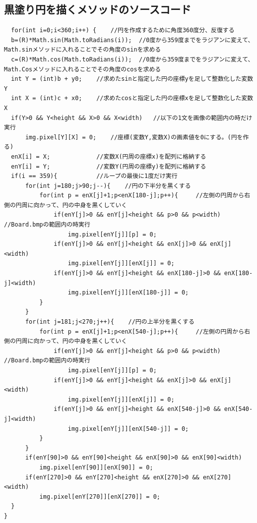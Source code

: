 \documentclass{jsarticle}
\begin{document}
\subsection{黒塗り円を描くメソッドのソースコード}
\begin{verbatim}
  for(int i=0;i<360;i++) {    //円を作成するために角度360度分、反復する
  b=(R)*Math.sin(Math.toRadians(i));  //0度から359度までをラジアンに変えて、Math.sinメソッドに入れることでその角度のsinを求める
  c=(R)*Math.cos(Math.toRadians(i));  //0度から359度までをラジアンに変えて、Math.Cosメソッドに入れることでその角度のcosを求める
  int Y = (int)b + y0;    //求めたsinと指定した円の座標yを足して整数化した変数Y
  int X = (int)c + x0;    //求めたcosと指定した円の座標xを足して整数化した変数X
  if(Y>0 && Y<height && X>0 && X<width)   //以下の1文を画像の範囲内の時だけ実行
      img.pixel[Y][X] = 0;    //座標(変数Y,変数X)の画素値を0にする。(円を作る)
  enX[i] = X;             //変数X(円周の座標x)を配列に格納する
  enY[i] = Y;             //変数Y(円周の座標y)を配列に格納する
  if(i == 359){           //ループの最後に1度だけ実行
      for(int j=180;j>90;j--){    //円の下半分を黒くする
          for(int p = enX[j]+1;p<enX[180-j];p++){     //左側の円周から右側の円周に向かって、円の中身を黒くしていく
              if(enY[j]>0 && enY[j]<height && p>0 && p<width) //Board.bmpの範囲内の時実行
                  img.pixel[enY[j]][p] = 0;
              if(enY[j]>0 && enY[j]<height && enX[j]>0 && enX[j]<width)
                  img.pixel[enY[j]][enX[j]] = 0;
              if(enY[j]>0 && enY[j]<height && enX[180-j]>0 && enX[180-j]<width)
                  img.pixel[enY[j]][enX[180-j]] = 0;
          }
      }
      for(int j=181;j<270;j++){    //円の上半分を黒くする
          for(int p = enX[j]+1;p<enX[540-j];p++){     //左側の円周から右側の円周に向かって、円の中身を黒くしていく
              if(enY[j]>0 && enY[j]<height && p>0 && p<width) //Board.bmpの範囲内の時実行
                  img.pixel[enY[j]][p] = 0;
              if(enY[j]>0 && enY[j]<height && enX[j]>0 && enX[j]<width)
                  img.pixel[enY[j]][enX[j]] = 0;
              if(enY[j]>0 && enY[j]<height && enX[540-j]>0 && enX[540-j]<width)
                  img.pixel[enY[j]][enX[540-j]] = 0;
          }
      }
      if(enY[90]>0 && enY[90]<height && enX[90]>0 && enX[90]<width)
          img.pixel[enY[90]][enX[90]] = 0;
      if(enY[270]>0 && enY[270]<height && enX[270]>0 && enX[270]<width)
          img.pixel[enY[270]][enX[270]] = 0;
  }
}
\end{verbatim}
\end{document}
